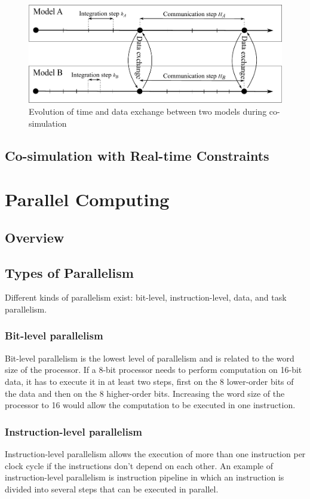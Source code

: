 \begin{figure}[htb]
\centering
  \includegraphics[scale=0.7]{figures/Co-Simulation}
\caption{Evolution of time and data exchange between two models during co-simulation}
\label{fig:cosim}
\end{figure}

\subsection{Co-simulation with Real-time Constraints}

\section{Parallel Computing}

\subsection{Overview}

\subsection{Types of Parallelism}

Different kinds of parallelism exist: bit-level, instruction-level, data, and task parallelism.

\subsubsection{Bit-level parallelism}
Bit-level parallelism is the lowest level of parallelism and is related to the word size of the processor. If a 8-bit processor needs to perform computation on 16-bit data, it has to execute it in at least two steps, first on the 8 lower-order bits of the data and then on the 8 higher-order bits. Increasing the word size of the processor to 16 would allow the computation to be executed in one instruction. 

\subsubsection{Instruction-level parallelism}
Instruction-level parallelism allows the execution of more than one instruction per clock cycle if the instructions don't depend on each other. An example of instruction-level parallelism is instruction pipeline in which an instruction is divided into several steps that can be executed in parallel.

